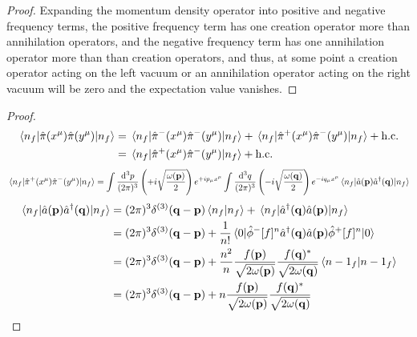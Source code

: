\qkgnumbermomentumdensitymean
\begin{proof}
	Expanding the momentum density operator into positive and negative frequency terms, the positive frequency term has one creation operator more than annihilation operators, and the negative frequency term has one annihilation operator more than than creation operators, and thus, at some point a creation operator acting on the left vacuum or an annihilation operator acting on the right vacuum will be zero and the expectation value vanishes.
\end{proof}
\qkgnumbermomentumdensitycorr
\begin{proof}
	\begin{equation*}
		\begin{split}
			\expval{\hat\pi(x^\mu)\hat\pi(y^\mu)}{n_f}
			&=
			\expval{\hat\pi^-(x^\mu)\hat\pi^-(y^\mu)}{n_f}
			+
			\expval{\hat\pi^+(x^\mu)\hat\pi^-(y^\mu)}{n_f}
			+
			\text{h.c.}
			\\
			&=
			\expval{\hat\pi^+(x^\mu)\hat\pi^-(y^\mu)}{n_f}
			+
			\text{h.c.}
		\end{split}
	\end{equation*}
	\begin{equation*}
		\expval{\hat\pi^+(x^\mu)\hat\pi^-(y^\mu)}{n_f}
		=
		\int\frac{\dd[3]{p}}{(2\pi)^3}
		\left(+i\sqrt{\frac{\omega(\vb{p})}{2}}\right)
		e^{+ip_\mu x^\mu}
		\int\frac{\dd[3]{q}}{(2\pi)^3}
		\left(-i\sqrt{\frac{\omega(\vb{q})}{2}}\right)
		e^{-iq_\mu x^\mu}
		\expval{\hat{a}(\vb{p})\hat{a}^\dagger(\vb{q})}{n_f}
	\end{equation*}
	\begin{equation*}
		\begin{split}
			\expval{\hat{a}(\vb{p})\hat{a}^\dagger(\vb{q})}{n_f}
			&=
			(2\pi)^3\delta^{(3)}(\vb{q}-\vb{p})
			\braket{n_f}
			+
			\expval{\hat{a}^\dagger(\vb{q})\hat{a}(\vb{p})}{n_f}
			\\
			&=
			(2\pi)^3\delta^{(3)}(\vb{q}-\vb{p})
			+
			\frac{1}{n!}
			\expval{
				\hat\phi^-[f]^n
				\hat{a}^\dagger(\vb{q})
				\hat{a}(\vb{p})
				\hat\phi^+[f]^n
			}{0}
			\\
			&=
			(2\pi)^3\delta^{(3)}(\vb{q}-\vb{p})
			+
			\frac{n^2}{n}
			\frac{f(\vb{p})}{\sqrt{2\omega(\vb{p})}}
			\frac{f(\vb{q})^*}{\sqrt{2\omega(\vb{q})}}
			\braket{n-1_f}
			\\
			&=
			(2\pi)^3\delta^{(3)}(\vb{q}-\vb{p})
			+
			n
			\frac{f(\vb{p})}{\sqrt{2\omega(\vb{p})}}
			\frac{f(\vb{q})^*}{\sqrt{2\omega(\vb{q})}}
		\end{split}
	\end{equation*}

\end{proof}
